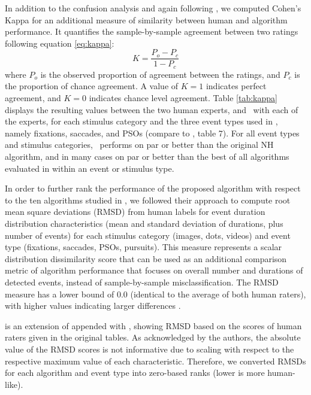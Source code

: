 In addition to the confusion analysis and again following \citet{Andersson2017},
we computed Cohen's Kappa \citep{cohen1960coefficient} for an additional measure
of similarity between human and algorithm performance. It quantifies the
sample-by-sample agreement between two ratings following equation \ref{eq:kappa}:
%
\begin{equation}\label{eq:kappa}
K = \frac{P_o - P_c}{1- P_c}
\end{equation}
%
where $P_o$ is the observed proportion of agreement between the ratings, and
$P_c$ is the proportion of chance agreement. A value of $K=1$ indicates perfect
agreement, and $K=0$ indicates chance level agreement.
Table \ref{tab:kappa} displays the resulting values
between the two human experts, and \remodnav\ with each of the experts, for
each stimulus category and the three event types used in \citet{Andersson2017},
namely fixations, saccades, and PSOs (compare to \citet{Andersson2017}, table 7).
For all event types and stimulus categories, \remodnav\ performs on par or better
than the original NH algorithm, and in many cases on par or better than the best
of all algorithms evaluated in \citet{Andersson2017} within an event or stimulus type.

In order to further rank the performance of the proposed algorithm with respect
to the ten algorithms studied in \citet{Andersson2017}, we followed their
approach to compute root mean square deviations (RMSD) from human labels for
event duration distribution characteristics (mean and standard deviation of
durations, plus number of events) for each stimulus category (images, dots,
videos) and event type (fixations, saccades, PSOs, pursuits). This measure
represents a scalar distribution dissimilarity score that can be used as an
additional comparison metric of algorithm performance that focuses on overall
number and durations of detected events, instead of sample-by-sample
misclassification. The RMSD measure has a lower bound of $0.0$ (identical to
the average of both human raters), with higher values indicating larger
differences \citep[for detail information on the calculation of this metric
see][]{Andersson2017}.

 is an extension of \citet[Tables
3-6]{Andersson2017} appended with \remodnav, showing RMSD based on the scores of human raters given in the original tables. As
acknowledged by the authors, the absolute value of the RMSD scores is not
informative due to scaling with respect to the respective maximum value of each
characteristic.  Therefore, we converted RMSDs for each algorithm and event
type into zero-based ranks (lower is more human-like).

